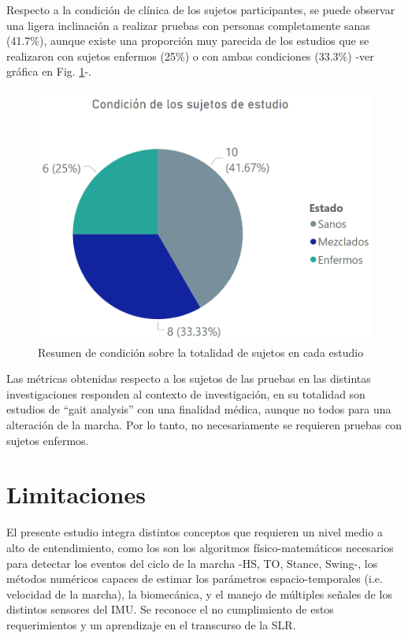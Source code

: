 Respecto a la condición de clínica de los sujetos participantes, se puede observar una ligera inclinación a realizar pruebas con personas completamente sanas (41.7\%), aunque existe una proporción muy parecida de los estudios que se realizaron con sujetos enfermos (25\%) o con ambas condiciones (33.3\%) -ver gráfica en Fig. \ref{fig:subjects-condition}-. 

\begin{figure}[H]
\centering
\includegraphics{TESIS/imagenes/chap03/sintesis_subjects.PNG}
\caption{Resumen de condición sobre la totalidad de sujetos en cada estudio}
\label{fig:subjects-condition}
\end{figure}

\noindent Las métricas obtenidas respecto a los sujetos de las pruebas en las distintas investigaciones responden al contexto de investigación, en su totalidad son estudios de ``gait analysis'' con una finalidad médica, aunque no todos para una alteración de la marcha. Por lo tanto, no necesariamente se requieren pruebas con sujetos enfermos.

\section{Limitaciones}\label{synthesis_2}

El presente estudio integra distintos conceptos que requieren un nivel medio a alto de entendimiento, como los son los algoritmos físico-matemáticos necesarios para detectar los eventos del ciclo de la marcha -HS, TO, Stance, Swing-, los métodos numéricos capaces de estimar los parámetros espacio-temporales (i.e. velocidad de la marcha), la biomecánica, y el manejo de múltiples señales de los distintos sensores del IMU. Se reconoce el no cumplimiento de estos requerimientos y un aprendizaje en el transcurso de la SLR. 


